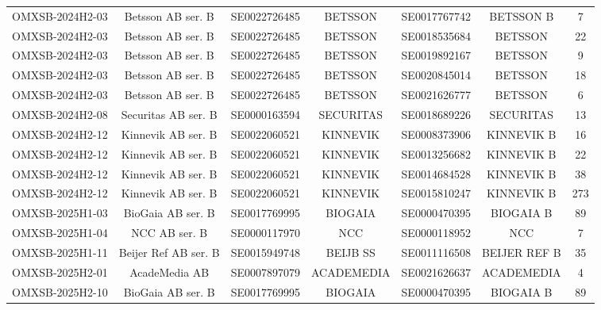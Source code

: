 \begin{threeparttable}
\begin{tabular}{@{}lcccccc}
\addlinespace[0.25ex]
\addlinespace[0.25ex]
OMXSB-2024H2-03 & Betsson AB ser. B & SE0022726485 & BETSSON & SE0017767742 & BETSSON B & 7 \\
\addlinespace[0.25ex]
\addlinespace[0.25ex]
OMXSB-2024H2-03 & Betsson AB ser. B & SE0022726485 & BETSSON & SE0018535684 & BETSSON & 22 \\
\addlinespace[0.25ex]
\addlinespace[0.25ex]
OMXSB-2024H2-03 & Betsson AB ser. B & SE0022726485 & BETSSON & SE0019892167 & BETSSON & 9 \\
\addlinespace[0.25ex]
\addlinespace[0.25ex]
OMXSB-2024H2-03 & Betsson AB ser. B & SE0022726485 & BETSSON & SE0020845014 & BETSSON & 18 \\
\addlinespace[0.25ex]
\addlinespace[0.25ex]
OMXSB-2024H2-03 & Betsson AB ser. B & SE0022726485 & BETSSON & SE0021626777 & BETSSON & 6 \\
\addlinespace[0.25ex]
\addlinespace[0.25ex]
OMXSB-2024H2-08 & Securitas AB ser. B & SE0000163594 & SECURITAS & SE0018689226 & SECURITAS & 13 \\
\addlinespace[0.25ex]
\addlinespace[0.25ex]
OMXSB-2024H2-12 & Kinnevik AB ser. B & SE0022060521 & KINNEVIK & SE0008373906 & KINNEVIK B & 16 \\
\addlinespace[0.25ex]
\addlinespace[0.25ex]
OMXSB-2024H2-12 & Kinnevik AB ser. B & SE0022060521 & KINNEVIK & SE0013256682 & KINNEVIK B & 22 \\
\addlinespace[0.25ex]
\addlinespace[0.25ex]
OMXSB-2024H2-12 & Kinnevik AB ser. B & SE0022060521 & KINNEVIK & SE0014684528 & KINNEVIK B & 38 \\
\addlinespace[0.25ex]
\addlinespace[0.25ex]
OMXSB-2024H2-12 & Kinnevik AB ser. B & SE0022060521 & KINNEVIK & SE0015810247 & KINNEVIK B & 273 \\
\addlinespace[0.25ex]
\addlinespace[0.25ex]
OMXSB-2025H1-03 & BioGaia AB ser. B & SE0017769995 & BIOGAIA & SE0000470395 & BIOGAIA B & 89 \\
\addlinespace[0.25ex]
\addlinespace[0.25ex]
OMXSB-2025H1-04 & NCC AB ser. B & SE0000117970 & NCC & SE0000118952 & NCC & 7 \\
\addlinespace[0.25ex]
\addlinespace[0.25ex]
OMXSB-2025H1-11 & Beijer Ref AB ser. B & SE0015949748 & BEIJB SS & SE0011116508 & BEIJER REF B & 35 \\
\addlinespace[0.25ex]
\addlinespace[0.25ex]
OMXSB-2025H2-01 & AcadeMedia AB & SE0007897079 & ACADEMEDIA & SE0021626637 & ACADEMEDIA & 4 \\
\addlinespace[0.25ex]
\addlinespace[0.25ex]
OMXSB-2025H2-10 & BioGaia AB ser. B & SE0017769995 & BIOGAIA & SE0000470395 & BIOGAIA B & 89 \\

\end{tabular}
\end{threeparttable}
